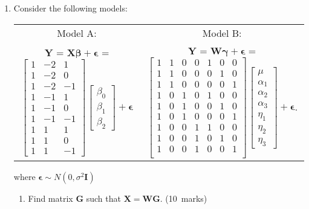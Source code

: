 \documentclass[soln,12pt]{utarexam}
\begin{document}
 \begin{enumerate}
\item \label{NT-Q12b}
Consider the following models:
\begin{center}
\begin{tabular}{|c|c|}\hline
Model A:& Model B:\\
$\mathbf{Y}$ = $\mathbf{X}\bm{\beta} + \bm{\epsilon}$
= $\begin{bmatrix}
        1&-2&1\\1&-2&0\\1&-2&-1\\1&-1&1\\1&-1&0\\1&-1&-1\\1&1&1\\1&1&0\\1&1&-1
      \end{bmatrix}$$\begin{bmatrix} \beta_0 \\ \beta_1 \\ \beta_2\end{bmatrix} + \bm{\epsilon}$&$\mathbf{Y}$ = $\mathbf{W}\bm{\gamma} + \bm{\epsilon}$
= $\begin{bmatrix}
        1&1&0&0&1&0&0\\
        1&1&0&0&0&1&0\\
        1&1&0&0&0&0&1\\
        1&0&1&0&1&0&0\\
        1&0&1&0&0&1&0\\
        1&0&1&0&0&0&1\\
        1&0&0&1&1&0&0\\
        1&0&0&1&0&1&0\\
        1&0&0&1&0&0&1\\
      \end{bmatrix}$$\begin{bmatrix} \mu \\ \alpha_1 \\ \alpha_2 \\ \alpha_3 \\ \eta_1 \\ \eta_2 \\ \eta_3\end{bmatrix} + \bm{\epsilon}$.\\\hline
\end{tabular}
\end{center}
 where  $\bm{\epsilon} \sim N(0, \sigma^2\mathbf{I})$
  \begin{enumerate}
  \item Find matrix $\mathbf{G}$ such that $\mathbf{X} = \mathbf{WG}$. \hfill(10~marks)
    \begin{answer}~


\end{answer}
\end{enumerate}
\end{enumerate}
\end{document}
